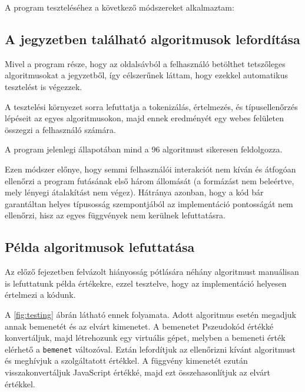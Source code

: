 A program teszteléséhez a következő módszereket alkalmaztam:

\subsection{A jegyzetben található algoritmusok lefordítása}

Mivel a program része, hogy az oldalsávból a felhasználó betölthet tetszőleges algoritmusokat a jegyzetből, így célszerűnek láttam, hogy ezekkel automatikus tesztelést is végezzek.

A tesztelési környezet sorra lefuttatja a tokenizálás, értelmezés, és típusellenőrzés lépéseit az egyes algoritmusokon, majd ennek eredményét egy webes felületen összegzi a felhasználó számára.

A program jelenlegi állapotában mind a 96 algoritmust sikeresen feldolgozza.

Ezen módszer előnye, hogy semmi felhasználói interakciót nem kíván és átfogóan ellenőrzi a program futásának első három állomását (a formázást nem beleértve, mely lényegi átalakítást nem végez). Hátránya azonban, hogy a kód bár garantáltan helyes típusosság szempontjából az implementáció pontosságát nem ellenőrzi, hisz az egyes függvények nem kerülnek lefuttatásra.

\subsection{Példa algoritmusok lefuttatása}

Az előző fejezetben felvázolt hiányosság pótlására néhány algoritmust manuálisan is lefuttatunk példa értékekre, ezzel tesztelve, hogy az implementáció helyesen értelmezi a kódunk.


A \ref{fig:testing} ábrán látható ennek folyamata. Adott algoritmus esetén megadjuk annak bemenetét és az elvárt kimenetet. A bemenetet Pszeudokód értékké konvertáljuk, majd létrehozunk egy virtuális gépet, melyben a bemeneti érték elérhető a \texttt{bemenet} változóval. Eztán lefordítjuk az ellenőrizni kívánt algoritmust és meghívjuk a szolgáltatott értékkel. A függvény kimenetét ezután visszakonvertáljuk JavaScript értékké, majd ezt összehasonlítjuk az elvárt értékkel.